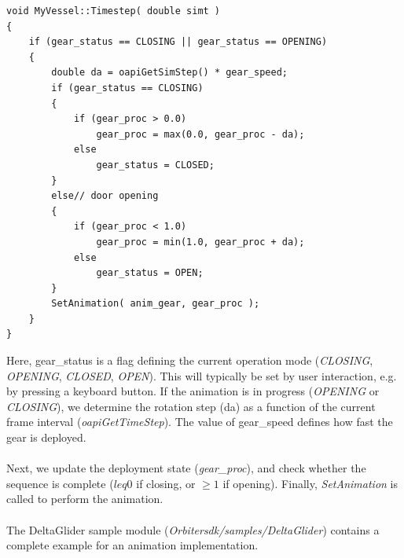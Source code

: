 \documentclass[Orbiter Developer Manual.tex]{subfiles}
\begin{document}
\begin{lstlisting}
void MyVessel::Timestep( double simt )
{
	if (gear_status == CLOSING || gear_status == OPENING)
	{
		double da = oapiGetSimStep() * gear_speed;
		if (gear_status == CLOSING)
		{
			if (gear_proc > 0.0)
				gear_proc = max(0.0, gear_proc - da);
			else
				gear_status = CLOSED;
		}
		else// door opening
		{
			if (gear_proc < 1.0)
				gear_proc = min(1.0, gear_proc + da);
			else
				gear_status = OPEN;
		}
		SetAnimation( anim_gear, gear_proc );
	}
}
\end{lstlisting}

\noindent
Here, gear\_status is a flag defining the current operation mode (\textit{CLOSING}, \textit{OPENING}, \textit{CLOSED}, \textit{OPEN}). This will typically be set by user interaction, e.g. by pressing a keyboard button. If the animation is in progress (\textit{OPENING} or \textit{CLOSING}), we determine the rotation step (da) as a function of the current frame interval (\textit{oapiGetTimeStep}). The value of gear\_speed defines how fast the gear is deployed.\\
\\
Next, we update the deployment state (\textit{gear\_proc}), and check whether the sequence is complete ($leq 0$ if closing, or $\geq 1$ if opening). Finally, \textit{SetAnimation} is called to perform the animation.\\
\\
The DeltaGlider sample module (\textit{Orbitersdk/samples/DeltaGlider}) contains a complete example for an animation implementation.
\end{document}
